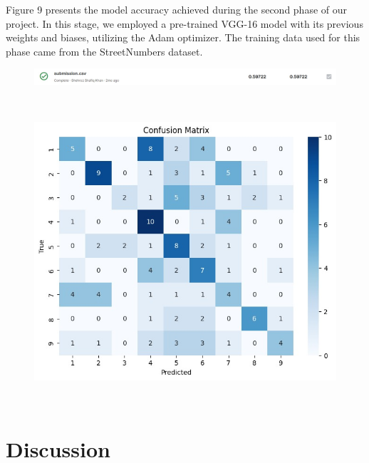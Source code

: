 \documentclass[12pt,a4paper]{article}
\begin{document}
\linebreak
\linebreak
\linebreak

Figure 9 presents the model accuracy achieved during the second phase of our project. In this stage, we employed a pre-trained VGG-16 model with its previous weights and biases, utilizing the Adam optimizer. The training data used for this phase came from the StreetNumbers dataset.

\begin{figure}[h]
    \centering
    
    \includegraphics[width=\linewidth]{images/Score 2.jpeg}
     
     
     \caption{}     \label{fig:my_label} 
    \end{figure}\\
\linebreak
\linebreak
\begin{figure}[h]
    \centering
    \includegraphics[width=\linewidth]{images/Confusion Matrix.jpeg}
     
     
     \caption{}     \label{fig:my_label} 
    \end{figure}\\

\Pagebreak
\section{Discussion}
\end{document}
